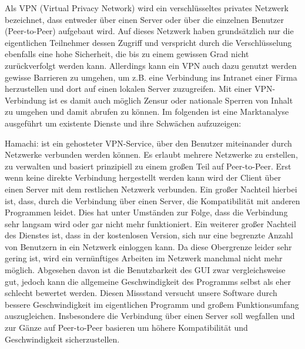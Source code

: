 \documentclass[a4paper,12pt]{scrreprt}
\begin{document}
	Als VPN (Virtual Privacy Network) wird ein verschlüsseltes privates Netzwerk bezeichnet, dass entweder über einen Server oder über die einzelnen Benutzer (Peer-to-Peer) aufgebaut wird. Auf dieses Netzwerk haben grundsätzlich nur die eigentlichen Teilnehmer dessen Zugriff und verspricht durch die Verschlüsselung ebenfalls eine hohe Sicherheit, die bis zu einem gewissen Grad nicht zurückverfolgt werden kann. Allerdings kann ein VPN auch dazu genutzt werden gewisse Barrieren zu umgehen, um z.B. eine Verbindung ins Intranet einer Firma herzustellen und dort auf einen lokalen Server zuzugreifen. Mit einer VPN-Verbindung ist es damit auch möglich Zensur oder nationale Sperren von Inhalt zu umgehen und damit abrufen zu können. Im folgenden ist eine Marktanalyse ausgeführt um existente Dienste und ihre Schwächen aufzuzeigen:
	
	Hamachi: ist ein gehosteter VPN-Service, über den Benutzer miteinander durch Netzwerke verbunden werden können. Es erlaubt mehrere Netzwerke zu erstellen, zu verwalten und basiert prinzipiell zu einem großen Teil auf Peer-to-Peer. Erst wenn keine direkte Verbindung hergestellt werden kann wird der Client über einen Server mit dem restlichen Netzwerk verbunden. Ein großer Nachteil hierbei ist, dass, durch die Verbindung über einen Server, die Kompatibilität mit anderen Programmen leidet. Dies hat unter Umständen zur Folge, dass die Verbindung sehr langsam wird oder gar nicht mehr funktioniert. Ein weiterer großer Nachteil des Dienstes ist, dass in der kostenlosen Version, sich nur eine begrenzte Anzahl von Benutzern in ein Netzwerk einloggen kann. Da diese Obergrenze leider sehr gering ist, wird ein vernünftiges Arbeiten im Netzwerk manchmal nicht mehr möglich. Abgesehen davon ist die Benutzbarkeit des GUI zwar vergleichsweise gut, jedoch kann die allgemeine Geschwindigkeit des Programms selbst als eher schlecht bewertet werden. Diesen Missstand versucht unsere Software durch bessere Geschwindigkeit im eigentlichen Programm und großem Funktionsumfang auszugleichen. Insbesondere die Verbindung über einen Server soll wegfallen und zur Gänze auf Peer-to-Peer basieren um höhere Kompatibilität und Geschwindigkeit sicherzustellen.
	
\end{document}
